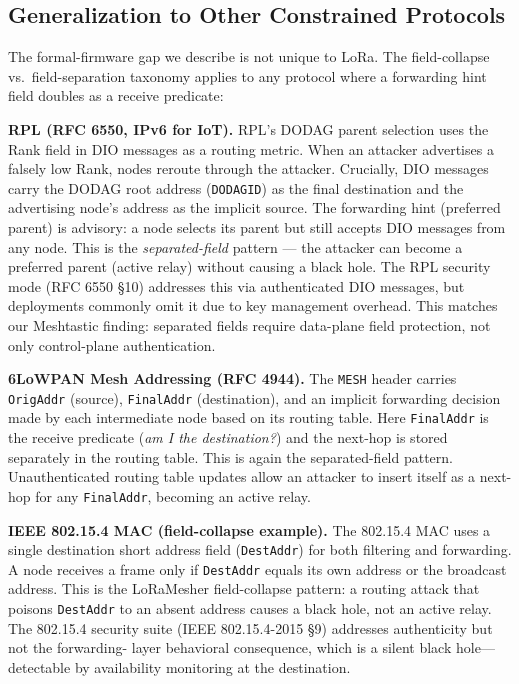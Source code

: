 \documentclass[journal]{IEEEtran}
\begin{document}
\subsection{Generalization to Other Constrained Protocols}

The formal-firmware gap we describe is not unique to LoRa. The
field-collapse vs.\ field-separation taxonomy applies to any protocol
where a forwarding hint field doubles as a receive predicate:

\textbf{RPL (RFC 6550, IPv6 for IoT).}
RPL's DODAG parent selection uses the Rank field in DIO messages as a
routing metric. When an attacker advertises a falsely low Rank, nodes
reroute through the attacker. Crucially, DIO messages carry the DODAG
root address (\texttt{DODAGID}) as the final destination and the
advertising node's address as the implicit source. The forwarding hint
(preferred parent) is advisory: a node selects its parent but still
accepts DIO messages from any node. This is the \emph{separated-field}
pattern --- the attacker can become a preferred parent (active relay)
without causing a black hole. The RPL security mode (RFC 6550 \S10)
addresses this via authenticated DIO messages, but deployments
commonly omit it due to key management overhead. This matches our
Meshtastic finding: separated fields require data-plane field protection,
not only control-plane authentication.

\textbf{6LoWPAN Mesh Addressing (RFC 4944).}
The \texttt{MESH} header carries \texttt{OrigAddr} (source),
\texttt{FinalAddr} (destination), and an implicit forwarding decision
made by each intermediate node based on its routing table. Here
\texttt{FinalAddr} is the receive predicate (\emph{am I the destination?})
and the next-hop is stored separately in the routing table. This is
again the separated-field pattern. Unauthenticated routing table updates
allow an attacker to insert itself as a next-hop for any
\texttt{FinalAddr}, becoming an active relay.

\textbf{IEEE 802.15.4 MAC (field-collapse example).}
The 802.15.4 MAC uses a single destination short address field
(\texttt{DestAddr}) for both filtering and forwarding. A node receives
a frame only if \texttt{DestAddr} equals its own address or the
broadcast address. This is the LoRaMesher field-collapse pattern: a
routing attack that poisons \texttt{DestAddr} to an absent address
causes a black hole, not an active relay. The 802.15.4 security suite
(IEEE 802.15.4-2015 \S9) addresses authenticity but not the forwarding-
layer behavioral consequence, which is a silent black hole---detectable
by availability monitoring at the destination.
\end{document}
